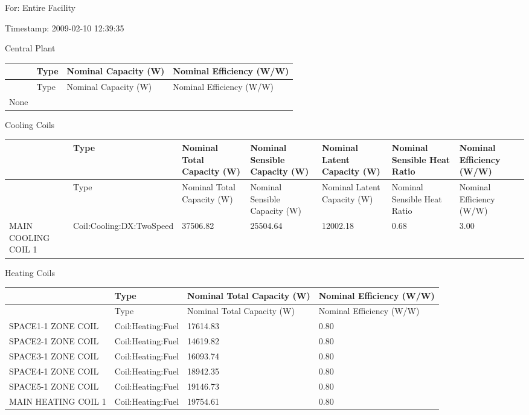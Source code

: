 For: Entire Facility

Timestamp: 2009-02-10 12:39:35

Central Plant

\begin{longtable}[c]{@{}llll@{}}
\toprule 
~ & Type & Nominal Capacity (W) & Nominal Efficiency (W/W) \tabularnewline
\midrule
\endfirsthead

\toprule 
~ & Type & Nominal Capacity (W) & Nominal Efficiency (W/W) \tabularnewline
\midrule
\endhead

None & ~ & ~ & ~ \tabularnewline
\bottomrule
\end{longtable}

Cooling Coils

{\scriptsize
\begin{longtable}[c]{>{\raggedright}p{0.85in}>{\raggedright}p{0.85in}>{\raggedright}p{0.85in}>{\raggedright}p{0.85in}>{\raggedright}p{0.85in}>{\raggedright}p{0.85in}>{\raggedright}p{0.85in}}
\toprule 
~ & Type & Nominal Total Capacity (W) & Nominal Sensible Capacity (W) & Nominal Latent Capacity (W) & Nominal Sensible Heat Ratio & Nominal Efficiency (W/W) \tabularnewline
\midrule
\endfirsthead

\toprule 
~ & Type & Nominal Total Capacity (W) & Nominal Sensible Capacity (W) & Nominal Latent Capacity (W) & Nominal Sensible Heat Ratio & Nominal Efficiency (W/W) \tabularnewline
\midrule
\endhead

MAIN COOLING COIL 1 & Coil:\-Cooling:\-DX:\-TwoSpeed & 37506.82 & 25504.64 & 12002.18 & 0.68 & 3.00 \tabularnewline
\bottomrule
\end{longtable}}

Heating Coils

{\scriptsize
\begin{longtable}[c]{>{\raggedright}p{1.5in}>{\raggedright}p{1.5in}>{\raggedright}p{1.5in}>{\raggedright}p{1.5in}}
\toprule 
~ & Type & Nominal Total Capacity (W) & Nominal Efficiency (W/W) \tabularnewline
\midrule
\endfirsthead

\toprule 
~ & Type & Nominal Total Capacity (W) & Nominal Efficiency (W/W) \tabularnewline
\midrule
\endhead

SPACE1-1 ZONE COIL & Coil:Heating:Fuel & 17614.83 & 0.80 \tabularnewline
SPACE2-1 ZONE COIL & Coil:Heating:Fuel & 14619.82 & 0.80 \tabularnewline
SPACE3-1 ZONE COIL & Coil:Heating:Fuel & 16093.74 & 0.80 \tabularnewline
SPACE4-1 ZONE COIL & Coil:Heating:Fuel & 18942.35 & 0.80 \tabularnewline
SPACE5-1 ZONE COIL & Coil:Heating:Fuel & 19146.73 & 0.80 \tabularnewline
MAIN HEATING COIL 1 & Coil:Heating:Fuel & 19754.61 & 0.80 \tabularnewline
\bottomrule
\end{longtable}}

